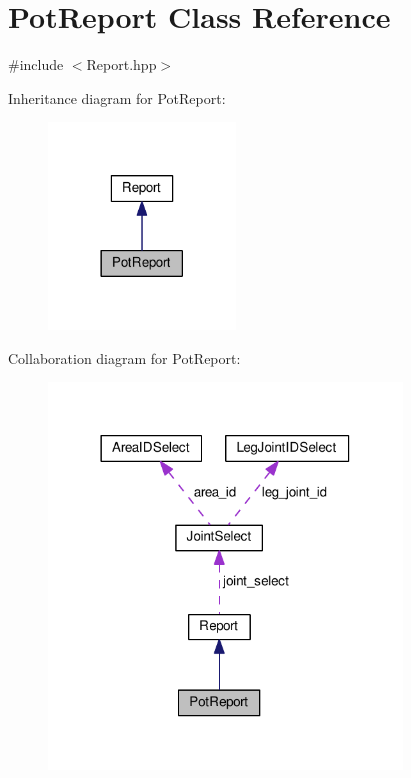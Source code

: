 \hypertarget{classPotReport}{}\section{Pot\+Report Class Reference}
\label{classPotReport}


{\ttfamily \#include $<$Report.\+hpp$>$}



Inheritance diagram for Pot\+Report\+:\nopagebreak
\begin{figure}[H]
\begin{center}
\leavevmode
\includegraphics[width=141pt]{classPotReport__inherit__graph}
\end{center}
\end{figure}


Collaboration diagram for Pot\+Report\+:\nopagebreak
\begin{figure}[H]
\begin{center}
\leavevmode
\includegraphics[width=266pt]{classPotReport__coll__graph}
\end{center}
\end{figure}
